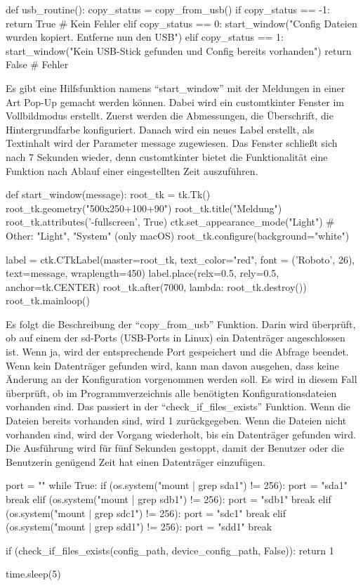 \begin{pythoncode}
def usb_routine():
	copy_status = copy_from_usb()
	if copy_status == -1:
		return True # Kein Fehler
	elif copy_status == 0:
		start_window("Config Dateien wurden kopiert. Entferne nun den USB")   
	elif copy_status == 1: 
		start_window("Kein USB-Stick gefunden und Config bereits vorhanden")  
	return False # Fehler
\end{pythoncode}

Es gibt eine Hilfsfunktion namens \enquote{start\_window} mit der Meldungen in einer Art Pop-Up gemacht werden können. Dabei wird ein customtkinter Fenster im Vollbildmodus erstellt. Zuerst werden die Abmessungen, die Überschrift, die Hintergrundfarbe konfiguriert. Danach wird ein neues Label erstellt, als Textinhalt wird der Parameter message zugewiesen. Das Fenster schließt sich nach 7 Sekunden wieder, denn customtkinter bietet die Funktionalität eine Funktion nach Ablauf einer eingestellten Zeit auszuführen. 
\begin{pythoncode}
def start_window(message):
	root_tk = tk.Tk() 
	root_tk.geometry("500x250+100+90")
	root_tk.title("Meldung")
	root_tk.attributes('-fullscreen', True)	
	ctk.set_appearance_mode("Light") # Other: "Light", "System" (only macOS)
	root_tk.configure(background="white")
	
	label = ctk.CTkLabel(master=root_tk, text_color="red", font = ('Roboto', 26), text=message,	wraplength=450)
	label.place(relx=0.5, rely=0.5, anchor=tk.CENTER)
	root_tk.after(7000, lambda: root_tk.destroy())
	root_tk.mainloop()
\end{pythoncode}

Es folgt die Beschreibung der \enquote{copy\_from\_usb} Funktion. Darin wird überprüft, ob auf einem der sd-Ports (USB-Ports in Linux) ein Datenträger angeschlossen ist. Wenn ja, wird der entsprechende Port gespeichert und die Abfrage beendet. Wenn kein Datenträger gefunden wird, kann man davon ausgehen, dass keine Änderung an der Konfiguration vorgenommen werden soll. Es wird in diesem Fall überprüft, ob im Programmverzeichnis alle benötigten Konfigurationsdateien vorhanden sind. Das passiert in der \enquote{check\_if\_files\_exists} Funktion. Wenn die Dateien bereits vorhanden sind, wird 1 zurückgegeben. Wenn die Dateien nicht vorhanden sind, wird der Vorgang wiederholt, bis ein Datenträger gefunden wird. Die Ausführung wird für fünf Sekunden gestoppt, damit der Benutzer oder die Benutzerin genügend Zeit hat einen Datenträger einzufügen.

\begin{pythoncode}
	port = ""
	while True:
		if (os.system("mount | grep sda1") != 256):
			port = "sda1"
			break
		elif (os.system("mount | grep sdb1") != 256):
			port = "sdb1"
			break
		elif (os.system("mount | grep sdc1") != 256):
			port = "sdc1"
			break
		elif (os.system("mount | grep sdd1") != 256):
			port = "sdd1"
			break
		
		if (check_if_files_exists(config_path, device_config_path, False)):
			return 1
			
		time.sleep(5)
\end{pythoncode}

